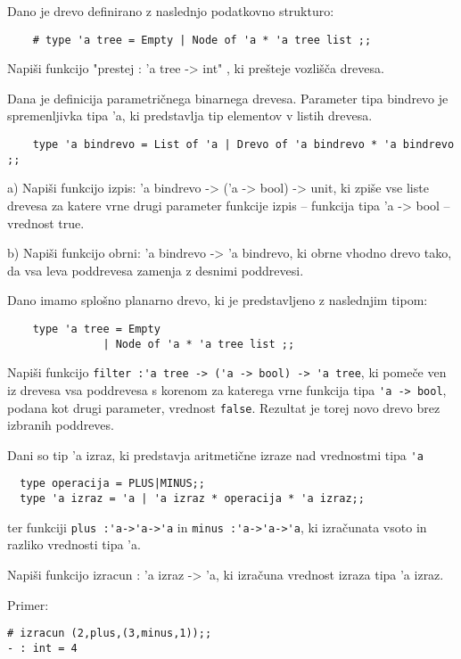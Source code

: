 \begin{ex}
Dano je drevo definirano z naslednjo podatkovno strukturo:

\begin{lstlisting}
	# type 'a tree = Empty | Node of 'a * 'a tree list ;;
\end{lstlisting}
Napi\v si funkcijo "prestej : 'a tree -> int" , ki pre\v steje vozli\v s\v ca drevesa.
\end{ex}




\begin{ex}
Dana je definicija parametri\v cnega binarnega drevesa. Parameter tipa bindrevo je spremenljivka tipa 'a, ki predstavlja tip elementov v listih drevesa.

\begin{lstlisting}
	type 'a bindrevo = List of 'a | Drevo of 'a bindrevo * 'a bindrevo ;;
\end{lstlisting}

a) Napi\v si funkcijo izpis: 'a bindrevo -> ('a -> bool) -> unit, ki zpi\v se vse liste drevesa za katere vrne drugi parameter funkcije izpis -- funkcija tipa 'a -> bool -- vrednost true. 

b) Napi\v si funkcijo obrni: 'a bindrevo -> 'a bindrevo, ki obrne vhodno drevo tako, da vsa leva poddrevesa zamenja z desnimi poddrevesi. 

\end{ex}




\begin{ex}
Dano imamo splo\v sno planarno drevo, ki je predstavljeno z naslednjim tipom:

\begin{lstlisting}
	type 'a tree = Empty 
               | Node of 'a * 'a tree list ;; 
\end{lstlisting}
Napi\v si funkcijo 
\lstinline{filter :'a tree -> ('a -> bool) -> 'a tree}, 
ki pome\v ce ven iz drevesa vsa poddrevesa s korenom za katerega vrne funkcija tipa 
\lstinline{'a -> bool},
podana kot drugi parameter, vrednost \lstinline{false}. Rezultat je torej novo drevo brez izbranih poddreves. 
\end{ex}




\begin{ex}
  Dani so tip 'a izraz, ki predstavja aritmeti\v cne izraze nad
  vrednostmi tipa \lstinline{'a}
\begin{lstlisting}
  type operacija = PLUS|MINUS;;
  type 'a izraz = 'a | 'a izraz * operacija * 'a izraz;;
\end{lstlisting}
  ter funkciji 
  \lstinline{plus :'a->'a->'a} in
  \lstinline{minus :'a->'a->'a}, 
  ki izra\v cunata vsoto in
  razliko vrednosti tipa 'a.

  Napi\v si funkcijo izracun : 'a izraz -> 'a, ki izra\v cuna vrednost
  izraza tipa 'a izraz.

\noindent\/Primer:
\begin{lstlisting}
# izracun (2,plus,(3,minus,1));;
- : int = 4
\end{lstlisting} 
\end{ex} 





